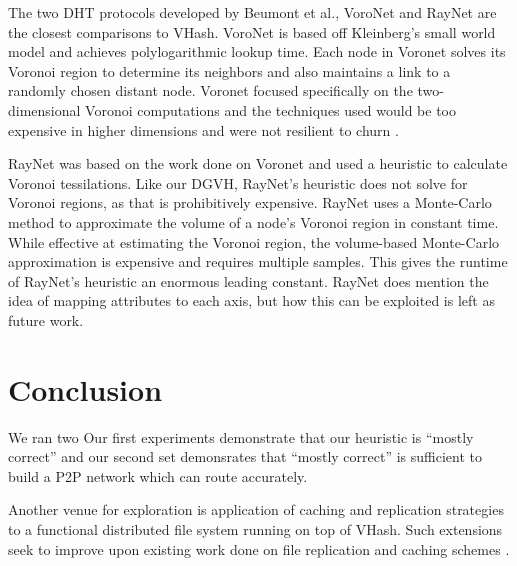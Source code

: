 \documentclass[11pt, conference, letterpaper]{IEEEtran}
\begin{document}
The two DHT protocols developed by Beumont et al., VoroNet \cite{voronet} and RayNet \cite{raynet} are the closest comparisons to VHash.
VoroNet is based off Kleinberg's small world model \cite{kleinberg2000navigation} and achieves polylogarithmic lookup time.  
Each node in Voronet solves its Voronoi region to determine its neighbors and also maintains a link to a randomly chosen distant node.
Voronet focused specifically on the two-dimensional Voronoi computations and the techniques used would be too expensive in higher dimensions and were not resilient to churn  \cite{raynet}.

RayNet \cite{raynet} was based on the work done on Voronet and used a heuristic to calculate Voronoi tessilations.  
Like our DGVH, RayNet's heuristic does not solve for Voronoi regions, as that is prohibitively expensive.  
RayNet uses a Monte-Carlo method to approximate the volume of a node's Voronoi region in constant time.  
While effective at estimating the Voronoi region,  the volume-based Monte-Carlo approximation is expensive and requires multiple samples. 
This gives the runtime of RayNet's heuristic an enormous leading constant.
RayNet does mention the idea of mapping attributes to each axis, but how this can be exploited is left as future work.







\section{Conclusion}
\label{sec:conclusion}


We ran two 
Our first experiments demonstrate that our heuristic is ``mostly correct'' and our second set demonsrates that ``mostly correct'' is sufficient to build a P2P network which can route accurately.



Another venue for exploration is application of caching and replication strategies to a functional distributed file system running on top of VHash.  Such extensions seek to improve upon existing work done on file replication and caching schemes \cite{shen2010irm}.







\end{document}
